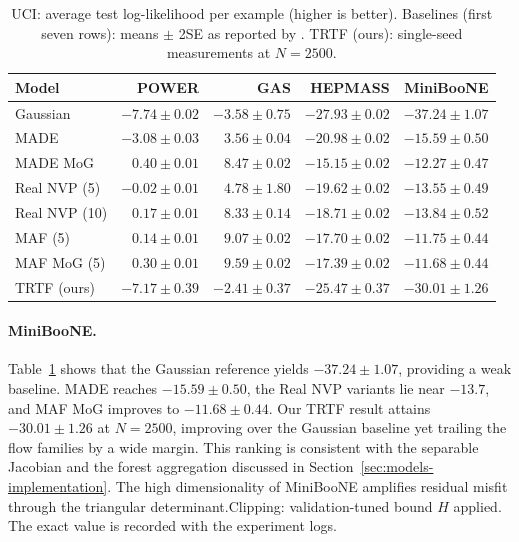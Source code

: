 \documentclass[11pt,a4paper,twoside]{book}\usepackage[]{graphicx}\usepackage[]{xcolor}
\begin{document}
\begin{table}[htbp]
 \centering
 \caption{UCI: average test log-likelihood per example (higher is better). Baselines (first seven rows): means $\pm$ 2SE as reported by \citet{papamakarios2017masked}. TRTF (ours): single-seed measurements at $N=2500$.}
 \label{tab:uci-loglik}
 \begin{tabular}{lrrrr}
 \hline
 Model & POWER & GAS & HEPMASS & MiniBooNE \\
 \hline
 Gaussian & $-7.74 \pm 0.02$ & $-3.58 \pm 0.75$ & $-27.93 \pm 0.02$ & $-37.24 \pm 1.07$ \\
 MADE & $-3.08 \pm 0.03$ & $ 3.56 \pm 0.04$ & $-20.98 \pm 0.02$ & $-15.59 \pm 0.50$ \\
 MADE MoG & $ 0.40 \pm 0.01$ & $ 8.47 \pm 0.02$ & $-15.15 \pm 0.02$ & $-12.27 \pm 0.47$ \\
 Real NVP (5) & $-0.02 \pm 0.01$ & $ 4.78 \pm 1.80$ & $-19.62 \pm 0.02$ & $-13.55 \pm 0.49$ \\
 Real NVP (10) & $ 0.17 \pm 0.01$ & $ 8.33 \pm 0.14$ & $-18.71 \pm 0.02$ & $-13.84 \pm 0.52$ \\
 MAF (5) & $ 0.14 \pm 0.01$ & $ 9.07 \pm 0.02$ & $-17.70 \pm 0.02$ & $-11.75 \pm 0.44$ \\
 MAF MoG (5) & $ 0.30 \pm 0.01$ & $ 9.59 \pm 0.02$ & $-17.39 \pm 0.02$ & $-11.68 \pm 0.44$ \\
 TRTF (ours) & $-7.17 \pm 0.39$ & $-2.41 \pm 0.37$ & $-25.47 \pm 0.37$ & $-30.01 \pm 1.26$ \\
 \hline
 \end{tabular}
\end{table}

\paragraph{MiniBooNE.} Table~\ref{tab:uci-loglik} shows that the Gaussian reference yields $-37.24 \pm 1.07$, providing a weak baseline. MADE reaches $-15.59 \pm 0.50$, the Real NVP variants lie near $-13.7$, and MAF MoG improves to $-11.68 \pm 0.44$. Our TRTF result attains $-30.01 \pm 1.26$ at $N=2500$, improving over the Gaussian baseline yet trailing the flow families by a wide margin. This ranking is consistent with the separable Jacobian and the forest aggregation discussed in Section~\ref{sec:models-implementation}. The high dimensionality of MiniBooNE amplifies residual misfit through the triangular determinant.\;Clipping: validation-tuned bound $H$ applied. The exact value is recorded with the experiment logs.
\end{document}
